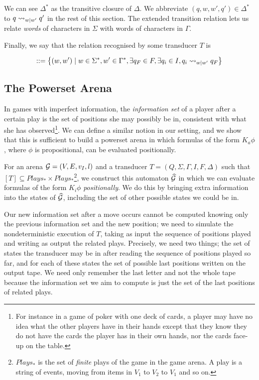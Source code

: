 \documentclass[ %
                    author={Leo Poulson},
                supervisor={Dr. Steven Ramsay},
                    degree={BSc},
                     title={Epistemic Planning for the Dynamic Gossip problem},
                  subtitle={},
                      year={2019} ]{dissertation}
\begin{document}
We can see $\Delta^\ast$ as the transitive closure of $\Delta$. We abbreviate
$(q, w, w', q') \in \Delta^\ast$ to $q \rightsquigarrow_{w \mid w'} q'$ in the rest of
this section. The extended transition relation lets us relate \emph{words} of
characters in $\Sigma$ with words of characters in $\Gamma$. 

Finally, we say that the relation recognised by some transducer $T$ is

\begin{align*}
  [T] ::= \left\{ (w, w') \mid w \in \Sigma^\ast, w' \in \Gamma^\ast, \exists q_F \in F, \exists q_i \in I, q_i \rsarrow_{w \mid w'} q_F \right\}
\end{align*}

\subsection{The Powerset Arena}
\label{sec:PowersetArena}

In games with imperfect information, the \emph{information set} of a player after a
certain play is the set of positions she may possibly be in, consistent with
what she has observed\footnote{For instance in a game of poker with one deck of cards, a
player may have no idea what the other players have in their hands except that
they know they do not have the cards the player has in their own hands, nor the
cards face-up on the table.}. We can define a similar notion in our setting, and
we show that this is sufficient to build a powerset arena in which formulas of
the form $K_a \phi$, where $\phi$ is propositional, can be evaluated positionally. 

For an arena $\mathcal{G} = (V, E, v_I, l)$ and a transducer $T = (Q, \Sigma, \Gamma,
I, F, \Delta)$ such that $[T] \subseteq Plays_\ast \times
Plays_\ast$\footnote{$Plays_\ast$ is the set of \emph{finite} plays of the game
  in the game arena. A play is a string of events, moving from items in $V_1$ to
  $V_2$ to $V_1$ and so on.}, we construct this automaton $\widehat{\mathcal{G}}$ in
which we can evaluate formulas of the form $K_i \phi$ \emph{positionally}. We do
this by bringing extra information into the states of $\widehat{\mathcal{G}}$, including
the set of other possible states we could be in.

Our new information set after a move occurs cannot be computed knowing only the
previous information set and the new position; we need to simulate the
nondeterministic execution of $T$, taking as input the sequence of positions
played and writing as output the related plays. Precisely, we need two things;
the set of states the transducer may be in after reading the sequence of
positions played so far, and for each of these states the set of possible last
positions written on the output tape. We need only remember the last letter and
not the whole tape because the information set we aim to compute is just the set
of the last positions of related plays.
\end{document}
